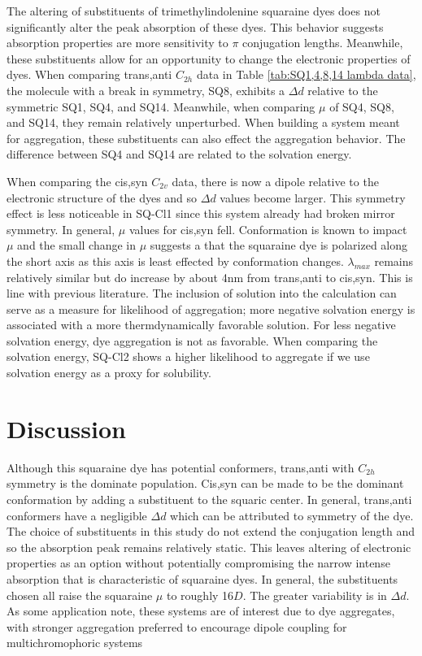 \documentclass[journal=jacsat,manuscript=article]{achemso}
\begin{document}
\newpage
The altering of substituents of trimethylindolenine squaraine dyes does not significantly alter the peak absorption of these dyes. This behavior suggests absorption properties are more sensitivity to $\pi$ conjugation lengths\cite{Yamaguchi2008HowEfficiency}.  Meanwhile, these substituents allow for an opportunity to change the electronic properties of dyes. When comparing trans,anti $C_{2h}$ data in Table \ref{tab:SQ1,4,8,14 lambda data}, the molecule with a break in symmetry, SQ8, exhibits a $\Delta d$ relative to the symmetric SQ1, SQ4, and SQ14. Meanwhile, when comparing $\mu$ of SQ4, SQ8, and SQ14, they remain relatively unperturbed. 
When building a system meant for aggregation, these substituents can also effect the aggregation behavior. The difference between SQ4 and SQ14 are related to the solvation energy.

When comparing the cis,syn $C_{2v}$ data, there is now a dipole relative to the electronic structure of the dyes and so $\Delta d$ values become larger. This symmetry effect is less noticeable in SQ-Cl1 since this system already had broken mirror symmetry. In general, $\mu$ values for cis,syn fell. Conformation is known to impact $\mu$\cite{Brand2011HowStructure} and the small change in $\mu$ suggests a that the squaraine dye is polarized along the short axis as this axis is least effected by conformation changes\cite{Lopata2011Excited-stateTD-ZINDO}. $\lambda_{max}$ remains relatively similar but do increase by about 4nm from trans,anti to cis,syn. This is line with previous literature\cite{Borrelli2014TheoreticalDye}.
The inclusion of solution into the calculation can serve as a measure for likelihood of aggregation; more negative solvation energy is associated with a more thermdynamically favorable solution. For less negative solvation energy, dye aggregation is not as favorable. When comparing the solvation energy, SQ-Cl2 shows a higher likelihood to aggregate if we use solvation energy as a proxy for solubility\cite{Fothergill2018AbDyes}. 
\newpage
\newpage
\section{Discussion}

Although this squaraine dye has potential conformers, trans,anti with $C_{2h}$ symmetry is the dominate population. Cis,syn can be made to be the dominant conformation by adding a substituent to the squaric center. In general, trans,anti conformers have a negligible $\Delta d$ which can be attributed to symmetry of the dye.
The choice of substituents in this study do not extend the conjugation length and so the absorption peak remains relatively static. This leaves altering of electronic properties as an option without potentially compromising the narrow intense absorption that is characteristic of squaraine dyes.
In general, the substituents chosen all raise the squaraine $\mu$ to roughly 16$D$. The greater variability is in $\Delta d$.
As some application note, these systems are of interest due to dye aggregates, with stronger aggregation preferred to encourage dipole coupling for multichromophoric systems
\end{document}
